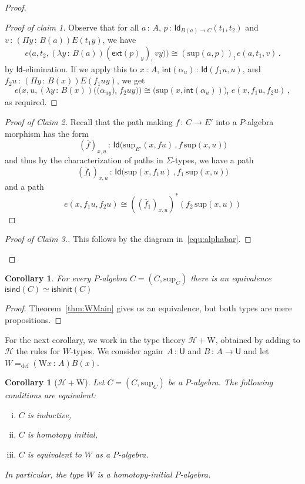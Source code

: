 \documentclass[10pt,a4paper,oneside,reqno]{amsart}
\numberwithin{equation}{section}
\def\noqed{\renewcommand{\qedsymbol}{}}
\theoremstyle{mythm}
\newtheorem{corollary}[theorem]{Corollary}
\theoremstyle{mydef}
\theoremstyle{myrmk}
\newcommand{\defeq}{=_{\mathrm{def}}}
\newcommand{\co}{\,{:}\,}
\newcommand{\iso}{\cong}
\newcommand{\Hint}{\mathcal{H}}
\newcommand{\isalgind}{\mathsf{isind}}
\newcommand{\isalghinit}{\mathsf{ishinit}}
\newcommand{\ext}{\mathsf{ext}}
\renewcommand{\int}{\mathsf{int}}
\newcommand{\Id}{\mathsf{Id}}
\newcommand{\W}{\mathrm{W}}
\newcommand{\U}{\mathsf{U}}
\renewcommand{\sup}{\mathrm{sup}}
\begin{document}
\begin{proof}
\begin{proof}[Proof of claim 1] 

Observe that for all $a \co A$, $p \co \Id_{B(a) \to C}(t_1, t_2)$  and 
$v \co (\Pi y \co B(a))E(t_1y)$, we have
\[ 
e \big( a, t_2,  (\lambda y \co B(a)) ( \ext(p)_y )_{!}\, v y \big) \big)  \iso
(\sup(a,p))_{!}\, e(a,t_1,v) \, . 
\]
by $\Id$-elimination. If we apply this to $x \co A$, $\int(\alpha_u) \co \Id( f_1 u, u)$, and $f_2 u \co
(\Pi y \co B(x)) E(f_1 u y)$, we get
\[
e\big(x, u , (\lambda y \co B(x)) \big( (\alpha_{u y} \big)_{!} \;  f_2 u y  \big) \big) 
\iso
\big( \sup(x,\int(\alpha_u)) \big)_{!} \; e(x, f_1 u , f_2 u)  \, ,
\]
as required. \noqed
\end{proof}  

\begin{proof}[Proof of Claim 2] Recall that the path making $f \co C \to E'$ into a $P$-algebra morphism has the
 form
 \[
( \overline{f})_{x,u} \co \Id \big( \sup_{E'}(x, fu) \, , f  \,  \sup(x,u) \big)
\]
and thus by the characterization of paths in $\Sigma$-types, we have a path 
\[
 (\overline{f}_1)_{x,u}  \co \Id \big( \sup(x, f_1 u) \, , f_1 \, \sup(x,u) \big)
 \] 
 and a path
 \[
  e(x, f_1 u, f_2 u) \iso  ( (\overline{f}_1)_{x,u} )^* ( f_2 \, \sup(x,u) )
 \]
\noqed
\end{proof}
 
\begin{proof}[Proof of Claim 3.]  This follows by the diagram in~\eqref{equ:alphabar}. 
\end{proof}  \noqed
\end{proof}


\begin{corollary} For every $P$-algebra $C = (C, \sup_C)$ there is an equivalence $\isalgind(C) \simeq \isalghinit(C)$ 
\end{corollary}

\begin{proof} Theorem~\ref{thm:WMain} gives us an equivalence, but both types are mere propositions.
\end{proof} 

For the next corollary, we work in the type theory $\Hint + \W$, obtained by adding to $\Hint$ the rules for $W$-types.
We consider again~$A \co \U$ and $B \co A \to \U$ and let~$W \defeq (\W x \co A) B(x)$.

\begin{corollary}[$\Hint + \W$]
\label{lem:WInitInt} Let $C = (C, \sup_C)$ be a $P$-algebra. The following conditions are
equivalent:
\begin{enumerate}[(i)]
\item $C$ is inductive,
\item $C$ is homotopy initial,
\item $C$ is equivalent to $W$ as a $P$-algebra.
\end{enumerate}
In particular, the type $W$ is a homotopy-initial $P$-algebra.
\end{corollary}
\end{document}
